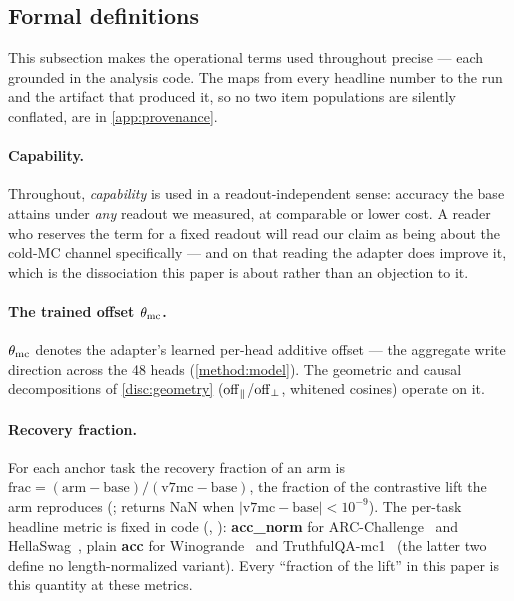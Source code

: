\subsection{Formal definitions}\label{sec:definitions}

This subsection makes the operational terms used throughout precise --- each
grounded in the analysis code. The maps from every headline number to the run and
the artifact that produced it, so no two item populations are silently conflated,
are in \cref{app:provenance}.

\paragraph{Capability.}
Throughout, \emph{capability} is used in a readout-independent sense: accuracy the
base attains under \emph{any} readout we measured, at comparable or lower cost. A
reader who reserves the term for a fixed readout will read our claim as being about
the cold-MC channel specifically --- and on that reading the adapter does improve it,
which is the dissociation this paper is about rather than an objection to it.

\paragraph{The trained offset $\theta_{\mathrm{mc}}$.}
$\theta_{\mathrm{mc}}$ denotes the adapter's learned per-head additive offset --- the aggregate
write direction across the 48 heads (\cref{method:model}). The geometric and causal
decompositions of \cref{disc:geometry} ($\mathrm{off}_{\parallel}$/$\mathrm{off}_{\perp}$, whitened cosines)
operate on it.

\paragraph{Recovery fraction.}
For each anchor task the recovery fraction of an arm is
$\mathrm{frac} = (\mathrm{arm} - \mathrm{base}) / (\mathrm{v7mc} - \mathrm{base})$,
the fraction of the contrastive lift the arm reproduces
(; returns NaN when
$|\mathrm{v7mc} - \mathrm{base}| < 10^{-9}$). The per-task headline metric is fixed
in code (, ): \textbf{acc\_norm} for ARC-Challenge~\citep{ARC}
and HellaSwag~\citep{HellaSwag}, plain \textbf{acc} for Winogrande~\citep{WinoGrande}
and TruthfulQA-mc1~\citep{TruthfulQA} (the latter two
define no length-normalized variant). Every ``fraction of the lift'' in this paper
is this quantity at these metrics.

